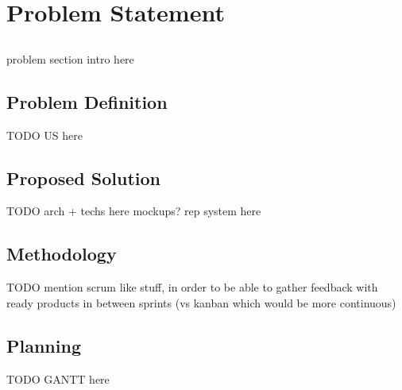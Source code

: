 \chapter{Problem Statement}\label{chap:problem}

\section*{}

problem section intro here

\section{Problem Definition}

TODO
US here

\section{Proposed Solution}

TODO
arch + techs here
mockups?
rep system here

\section{Methodology}

TODO
mention scrum like stuff, in order to be able to gather feedback with ready products in between sprints (vs kanban which would be more continuous)

\section{Planning}

TODO
GANTT here
